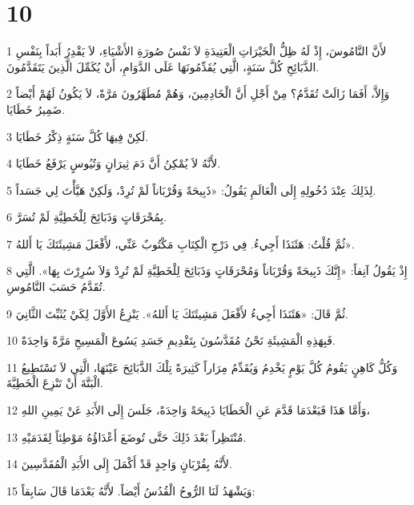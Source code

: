 \chapter{10}

\par 1 لأَنَّ النَّامُوسَ، إِذْ لَهُ ظِلُّ الْخَيْرَاتِ الْعَتِيدَةِ لاَ نَفْسُ صُورَةِ الأَشْيَاءِ، لاَ يَقْدِرُ أَبَداً بِنَفْسِ الذَّبَائِحِ كُلَّ سَنَةٍ، الَّتِي يُقَدِّمُونَهَا عَلَى الدَّوَامِ، أَنْ يُكَمِّلَ الَّذِينَ يَتَقَدَّمُونَ.
\par 2 وَإِلاَّ، أَفَمَا زَالَتْ تُقَدَّمُ؟ مِنْ أَجْلِ أَنَّ الْخَادِمِينَ، وَهُمْ مُطَهَّرُونَ مَرَّةً، لاَ يَكُونُ لَهُمْ أَيْضاً ضَمِيرُ خَطَايَا.
\par 3 لَكِنْ فِيهَا كُلَّ سَنَةٍ ذِكْرُ خَطَايَا.
\par 4 لأَنَّهُ لاَ يُمْكِنُ أَنَّ دَمَ ثِيرَانٍ وَتُيُوسٍ يَرْفَعُ خَطَايَا.
\par 5 لِذَلِكَ عِنْدَ دُخُولِهِ إِلَى الْعَالَمِ يَقُولُ: «ذَبِيحَةً وَقُرْبَاناً لَمْ تُرِدْ، وَلَكِنْ هَيَّأْتَ لِي جَسَداً.
\par 6 بِمُحْرَقَاتٍ وَذَبَائِحَ لِلْخَطِيَّةِ لَمْ تُسَرَّ.
\par 7 ثُمَّ قُلْتُ: هَئَنَذَا أَجِيءُ. فِي دَرْجِ الْكِتَابِ مَكْتُوبٌ عَنِّي، لأَفْعَلَ مَشِيئَتَكَ يَا أَللهُ».
\par 8 إِذْ يَقُولُ آنِفاً: «إِنَّكَ ذَبِيحَةً وَقُرْبَاناً وَمُحْرَقَاتٍ وَذَبَائِحَ لِلْخَطِيَّةِ لَمْ تُرِدْ وَلاَ سُرِرْتَ بِهَا». الَّتِي تُقَدَّمُ حَسَبَ النَّامُوسِ.
\par 9 ثُمَّ قَالَ: «هَئَنَذَا أَجِيءُ لأَفْعَلَ مَشِيئَتَكَ يَا أَللهُ». يَنْزِعُ الأَوَّلَ لِكَيْ يُثَبِّتَ الثَّانِيَ.
\par 10 فَبِهَذِهِ الْمَشِيئَةِ نَحْنُ مُقَدَّسُونَ بِتَقْدِيمِ جَسَدِ يَسُوعَ الْمَسِيحِ مَرَّةً وَاحِدَةً.
\par 11 وَكُلُّ كَاهِنٍ يَقُومُ كُلَّ يَوْمٍ يَخْدِمُ وَيُقَدِّمُ مِرَاراً كَثِيرَةً تِلْكَ الذَّبَائِحَ عَيْنَهَا، الَّتِي لاَ تَسْتَطِيعُ الْبَتَّةَ أَنْ تَنْزِعَ الْخَطِيَّةَ.
\par 12 وَأَمَّا هَذَا فَبَعْدَمَا قَدَّمَ عَنِ الْخَطَايَا ذَبِيحَةً وَاحِدَةً، جَلَسَ إِلَى الأَبَدِ عَنْ يَمِينِ اللهِ،
\par 13 مُنْتَظِراً بَعْدَ ذَلِكَ حَتَّى تُوضَعَ أَعْدَاؤُهُ مَوْطِئاً لِقَدَمَيْهِ.
\par 14 لأَنَّهُ بِقُرْبَانٍ وَاحِدٍ قَدْ أَكْمَلَ إِلَى الأَبَدِ الْمُقَدَّسِينَ.
\par 15 وَيَشْهَدُ لَنَا الرُّوحُ الْقُدُسُ أَيْضاً. لأَنَّهُ بَعْدَمَا قَالَ سَابِقاً:
